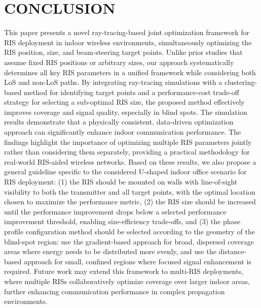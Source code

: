 \documentclass{IEEEoj}
\begin{document}
\section{CONCLUSION} \label{sec:conclusion}
This paper presents a novel ray-tracing-based joint optimization framework for RIS deployment in indoor wireless environments, simultaneously optimizing the RIS position, size, and beam-steering target points. Unlike prior studies that assume fixed RIS positions or arbitrary sizes, our approach systematically determines all key RIS parameters in a unified framework while considering both LoS and non-LoS paths. By integrating ray-tracing simulations with a clustering-based method for identifying target points and a performance-cost trade-off strategy for selecting a sub-optimal RIS size, the proposed method effectively improves coverage and signal quality, especially in blind spots. The simulation results demonstrate that a physically consistent, data-driven optimization approach can significantly enhance indoor communication performance. The findings highlight the importance of optimizing multiple RIS parameters jointly rather than considering them separately, providing a practical methodology for real-world RIS-aided wireless networks. Based on these results, we also propose a general guideline specific to the considered U-shaped indoor office scenario for RIS deployment: (1) the RIS should be mounted on walls with line-of-sight visibility to both the transmitter and all target points, with the optimal location chosen to maximize the performance metric, (2) the RIS size should be increased until the performance improvement drops below a selected performance improvement threshold, enabling size-efficiency trade-offs, and (3) the phase profile configuration method should be selected according to the geometry of the blind-spot region: use the gradient-based approach for broad, dispersed coverage areas where energy needs to be distributed more evenly, and use the distance-based approach for small, confined regions where focused signal enhancement is required. Future work may extend this framework to multi-RIS deployments, where multiple RISs collaboratively optimize coverage over larger indoor areas, further enhancing communication performance in complex propagation environments.
\end{document}
